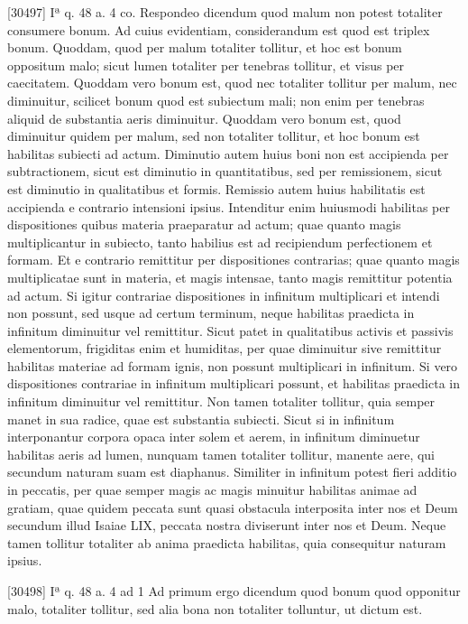 \documentclass[10pt]{jsarticle} %
\begin{document}
[30497] Iª q. 48 a. 4 co. Respondeo dicendum quod malum non potest totaliter consumere bonum. Ad cuius evidentiam, considerandum est quod est triplex bonum. Quoddam, quod per malum totaliter tollitur, et hoc est bonum oppositum malo; sicut lumen totaliter per tenebras tollitur, et visus per caecitatem. Quoddam vero bonum est, quod nec totaliter tollitur per malum, nec diminuitur, scilicet bonum quod est subiectum mali; non enim per tenebras aliquid de substantia aeris diminuitur. Quoddam vero bonum est, quod diminuitur quidem per malum, sed non totaliter tollitur, et hoc bonum est habilitas subiecti ad actum. Diminutio autem huius boni non est accipienda per subtractionem, sicut est diminutio in quantitatibus, sed per remissionem, sicut est diminutio in qualitatibus et formis. Remissio autem huius habilitatis est accipienda e contrario intensioni ipsius. Intenditur enim huiusmodi habilitas per dispositiones quibus materia praeparatur ad actum; quae quanto magis multiplicantur in subiecto, tanto habilius est ad recipiendum perfectionem et formam. Et e contrario remittitur per dispositiones contrarias; quae quanto magis multiplicatae sunt in materia, et magis intensae, tanto magis remittitur potentia ad actum. Si igitur contrariae dispositiones in infinitum multiplicari et intendi non possunt, sed usque ad certum terminum, neque habilitas praedicta in infinitum diminuitur vel remittitur. Sicut patet in qualitatibus activis et passivis elementorum, frigiditas enim et humiditas, per quae diminuitur sive remittitur habilitas materiae ad formam ignis, non possunt multiplicari in infinitum. Si vero dispositiones contrariae in infinitum multiplicari possunt, et habilitas praedicta in infinitum diminuitur vel remittitur. Non tamen totaliter tollitur, quia semper manet in sua radice, quae est substantia subiecti. Sicut si in infinitum interponantur corpora opaca inter solem et aerem, in infinitum diminuetur habilitas aeris ad lumen, nunquam tamen totaliter tollitur, manente aere, qui secundum naturam suam est diaphanus. Similiter in infinitum potest fieri additio in peccatis, per quae semper magis ac magis minuitur habilitas animae ad gratiam, quae quidem peccata sunt quasi obstacula interposita inter nos et Deum secundum illud Isaiae LIX, peccata nostra diviserunt inter nos et Deum. Neque tamen tollitur totaliter ab anima praedicta habilitas, quia consequitur naturam ipsius.

[30498] Iª q. 48 a. 4 ad 1 Ad primum ergo dicendum quod bonum quod opponitur malo, totaliter tollitur, sed alia bona non totaliter tolluntur, ut dictum est.
\end{document}
